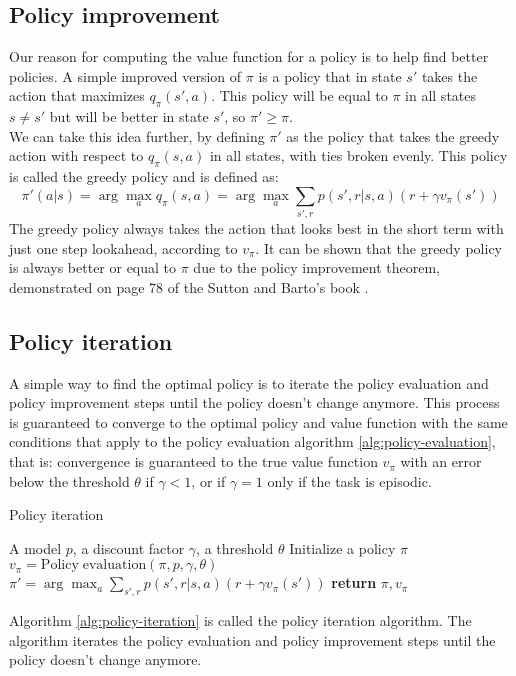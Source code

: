 \subsection{Policy improvement}
Our reason for computing the value function for a policy is to help find better policies. A simple improved version of $\pi$ is a policy that in state $s'$ takes the action that maximizes $q_{\pi}(s', a)$. This policy will be equal to $\pi$ in all states $s \neq s'$ but will be better in state $s'$, so $\pi' \geq \pi$.\\
We can take this idea further, by defining $\pi'$ as the policy that takes the greedy action with respect to $q_{\pi}(s, a)$ in all states, with ties broken evenly. This policy is called the greedy policy and is defined as:
\begin{equation}
    \pi'(a | s) = \arg \max_a q_{\pi}(s, a) = \arg \max_a \sum_{s', r} p(s', r | s, a) (r + \gamma v_{\pi}(s'))
    \label{greedy-policy}
\end{equation}
The greedy policy always takes the action that looks best in the short term with just one step lookahead, according to $v_{\pi}$. It can be shown that the greedy policy is always better or equal to $\pi$ due to the policy improvement theorem, demonstrated on page 78 of the Sutton and Barto's book \cite{sutton-barto}.\\

\subsection{Policy iteration}
A simple way to find the optimal policy is to iterate the policy evaluation and policy improvement steps until the policy doesn't change anymore. This process is guaranteed to converge to the optimal policy and value function with the same conditions that apply to the policy evaluation algorithm \ref{alg:policy-evaluation}, that is: convergence is guaranteed to the true value function $v_{\pi}$ with an error below the threshold $\theta$ if $\gamma < 1$, or if $\gamma = 1$ only if the task is episodic.\\
\begin{algorithm}[H]
    \caption{Policy iteration}
    \label{alg:policy-iteration}
    \begin{algorithmic}[1]
        \Require A model $p$, a discount factor $\gamma$, a threshold $\theta$
        \State Initialize a policy $\pi$
            \State $v_{\pi} = \mathrm{Policy \; evaluation} (\pi, p, \gamma, \theta)$ 
            \State $\pi' = \arg \max_a \sum_{s', r} p(s', r | s, a) (r + \gamma v_{\pi}(s'))$ 
                \State \textbf{return} $\pi, v_{\pi}$
            \EndIf
        \EndWhile
    \end{algorithmic}
\end{algorithm}
Algorithm \ref{alg:policy-iteration} is called the policy iteration algorithm. The algorithm iterates the policy evaluation and policy improvement steps until the policy doesn't change anymore.


